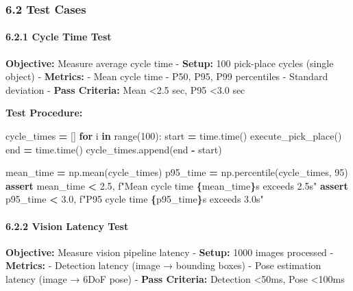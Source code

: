 \documentclass[
]{article}
\newenvironment{Shaded}{\begin{snugshade}}{\end{snugshade}}
\newcommand{\BuiltInTok}[1]{#1}
\newcommand{\ControlFlowTok}[1]{\textcolor[rgb]{0.13,0.29,0.53}{\textbf{#1}}}
\newcommand{\DecValTok}[1]{\textcolor[rgb]{0.00,0.00,0.81}{#1}}
\newcommand{\FloatTok}[1]{\textcolor[rgb]{0.00,0.00,0.81}{#1}}
\newcommand{\KeywordTok}[1]{\textcolor[rgb]{0.13,0.29,0.53}{\textbf{#1}}}
\newcommand{\NormalTok}[1]{#1}
\newcommand{\OperatorTok}[1]{\textcolor[rgb]{0.81,0.36,0.00}{\textbf{#1}}}
\newcommand{\SpecialCharTok}[1]{\textcolor[rgb]{0.81,0.36,0.00}{\textbf{#1}}}
\newcommand{\SpecialStringTok}[1]{\textcolor[rgb]{0.31,0.60,0.02}{#1}}
\begin{document}
\hypertarget{test-cases}{%
\subsubsection{6.2 Test Cases}\label{test-cases}}

\hypertarget{cycle-time-test}{%
\paragraph{6.2.1 Cycle Time Test}\label{cycle-time-test}}

\textbf{Objective:} Measure average cycle time - \textbf{Setup:} 100
pick-place cycles (single object) - \textbf{Metrics:} - Mean cycle time
- P50, P95, P99 percentiles - Standard deviation - \textbf{Pass
Criteria:} Mean \textless2.5 sec, P95 \textless3.0 sec

\textbf{Test Procedure:}

\begin{Shaded}
\begin{Highlighting}[]
\NormalTok{cycle\_times }\OperatorTok{=}\NormalTok{ []}
\ControlFlowTok{for}\NormalTok{ i }\KeywordTok{in} \BuiltInTok{range}\NormalTok{(}\DecValTok{100}\NormalTok{):}
\NormalTok{    start }\OperatorTok{=}\NormalTok{ time.time()}
\NormalTok{    execute\_pick\_place()}
\NormalTok{    end }\OperatorTok{=}\NormalTok{ time.time()}
\NormalTok{    cycle\_times.append(end }\OperatorTok{{-}}\NormalTok{ start)}

\NormalTok{mean\_time }\OperatorTok{=}\NormalTok{ np.mean(cycle\_times)}
\NormalTok{p95\_time }\OperatorTok{=}\NormalTok{ np.percentile(cycle\_times, }\DecValTok{95}\NormalTok{)}
\ControlFlowTok{assert}\NormalTok{ mean\_time }\OperatorTok{\textless{}} \FloatTok{2.5}\NormalTok{, }\SpecialStringTok{f"Mean cycle time }\SpecialCharTok{\{}\NormalTok{mean\_time}\SpecialCharTok{\}}\SpecialStringTok{s exceeds 2.5s"}
\ControlFlowTok{assert}\NormalTok{ p95\_time }\OperatorTok{\textless{}} \FloatTok{3.0}\NormalTok{, }\SpecialStringTok{f"P95 cycle time }\SpecialCharTok{\{}\NormalTok{p95\_time}\SpecialCharTok{\}}\SpecialStringTok{s exceeds 3.0s"}
\end{Highlighting}
\end{Shaded}

\hypertarget{vision-latency-test}{%
\paragraph{6.2.2 Vision Latency Test}\label{vision-latency-test}}

\textbf{Objective:} Measure vision pipeline latency - \textbf{Setup:}
1000 images processed - \textbf{Metrics:} - Detection latency (image →
bounding boxes) - Pose estimation latency (image → 6DoF pose) -
\textbf{Pass Criteria:} Detection \textless50ms, Pose \textless100ms
\end{document}
